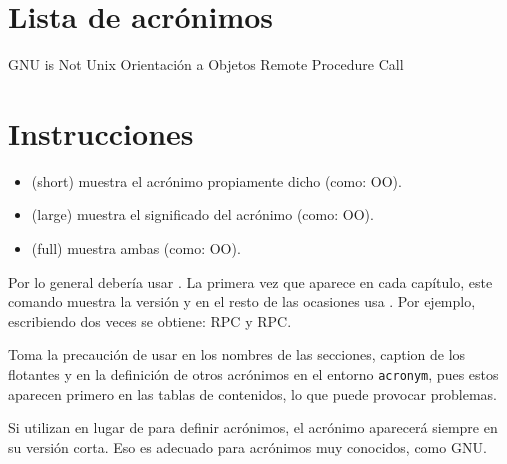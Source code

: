 \documentclass[a4paper, 11pt]{article}
\title{}
\begin{document}
\maketitle


\section{Lista de acrónimos}

{\small
\begin{acronym}[XXXXXXXX]
       {\acs{GNU} is Not Unix}
        {Orientación a Objetos}
       {Remote Procedure Call}
\end{acronym}
}


\section{Instrucciones}

\begin{itemize}
\item {} (short) muestra el acrónimo propiamente dicho (como: \acs{OO}).
\item {} (large) muestra el significado del acrónimo (como: \acl{OO}).
\item {} (full) muestra ambas (como: \acf{OO}).
\end{itemize}

Por lo general debería usar . La primera vez que aparece en cada capítulo, este
comando muestra la versión  y en el resto de las ocasiones usa
. Por ejemplo, escribiendo dos veces  se obtiene: \ac{RPC} y
\ac{RPC}.

Toma la precaución de usar  en los nombres de las secciones, caption de los
flotantes y en la definición de otros acrónimos en el entorno \texttt{acronym}, pues estos
aparecen primero en las tablas de contenidos, lo que puede provocar problemas.

Si utilizan  en lugar de  para definir acrónimos, el acrónimo
aparecerá siempre en su versión corta. Eso es adecuado para acrónimos muy conocidos, como
\ac{GNU}.
\end{document}
